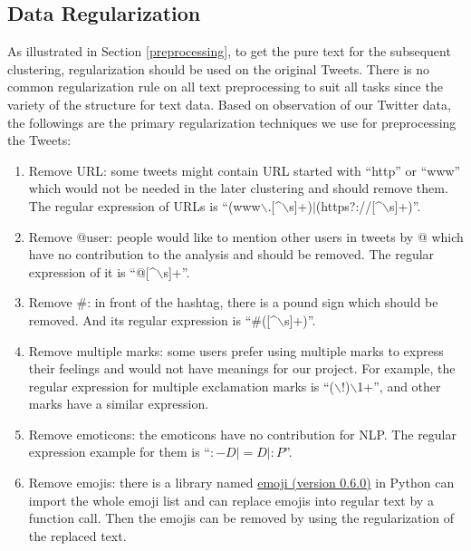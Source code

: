 \subsection{Data Regularization}
As illustrated in Section \ref{preprocessing}, to get the pure text for the subsequent clustering, regularization should be used on the original Tweets. There is no common regularization rule on all text preprocessing to suit all tasks since the variety of the structure for text data. Based on observation of our Twitter data, the followings are the primary regularization techniques we use for preprocessing the Tweets:

\begin{enumerate}
    \item Remove URL: some tweets might contain URL started with “http” or “www” which would not be needed in the later clustering and should remove them. The regular expression of URLs is “(www$\backslash$.[\^{}$\backslash$s]+)$|$(https?://[\^{}$\backslash$s]+)”.
    
    \item Remove @user: people would like to mention other users in tweets by @ which have no contribution to the analysis and should be removed. The regular expression of it is “@[\^{}$\backslash$s]+”.
    
    \item Remove \#: in front of the hashtag, there is a pound sign which should be removed. And its regular expression is “\#([\^{}$\backslash$s]+)”.
    
    \item Remove multiple marks: some users prefer using multiple marks to express their feelings and would not have meanings for our project. For example, the regular expression for multiple exclamation marks is “($\backslash$!)$\backslash$1+”, and other marks have a similar expression.
    
    \item Remove emoticons: the emoticons have no contribution for NLP. The regular expression example for them is “$:-D|=D|:P$”.
    
    \item Remove emojis: there is a library named \href{https://pypi.org/project/emoji/}{emoji (version 0.6.0)} in Python can import the whole emoji list and can replace emojis into regular text by a function call. Then the emojis can be removed by using the regularization of the replaced text.
    
\end{enumerate}


